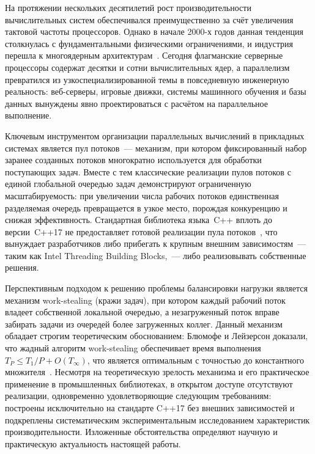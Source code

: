\introduction

На протяжении нескольких десятилетий рост производительности вычислительных
систем обеспечивался преимущественно за счёт увеличения тактовой частоты
процессоров. Однако в начале 2000-х годов данная тенденция столкнулась с
фундаментальными физическими ограничениями, и индустрия перешла к
многоядерным архитектурам~\cite{Sutter2005}. Сегодня флагманские серверные
процессоры содержат десятки и сотни вычислительных ядер, а параллелизм
превратился из узкоспециализированной темы в повседневную инженерную
реальность: веб-серверы, игровые движки, системы машинного обучения и базы
данных вынуждены явно проектироваться с расчётом на параллельное выполнение.

Ключевым инструментом организации параллельных вычислений в прикладных
системах является пул потоков~--- механизм, при котором фиксированный набор
заранее созданных потоков многократно используется для обработки поступающих
задач. Вместе с тем классические реализации пулов потоков с единой глобальной
очередью задач демонстрируют ограниченную масштабируемость: при увеличении
числа рабочих потоков единственная разделяемая очередь превращается в узкое
место, порождая конкуренцию и снижая эффективность. Стандартная библиотека
языка~C++ вплоть до версии~C++17 не предоставляет готовой реализации пула
потоков~\cite{Williams2019}, что вынуждает разработчиков либо прибегать к
крупным внешним зависимостям~--- таким как Intel Threading Building
Blocks,~--- либо реализовывать собственные решения.

Перспективным подходом к решению проблемы балансировки нагрузки является
механизм work-stealing (кражи задач), при котором каждый рабочий
поток владеет собственной локальной очередью, а незагруженный поток вправе
забирать задачи из очередей более загруженных коллег. Данный механизм обладает
строгим теоретическим обоснованием: Блюмофе и Лейзерсон доказали, что жадный
алгоритм work-stealing обеспечивает время выполнения $T_P \leq T_1 / P +
O(T_\infty)$, что является оптимальным с точностью до константного
множителя~\cite{Blumofe1999}. Несмотря на теоретическую зрелость механизма и
его практическое применение в промышленных библиотеках, в открытом доступе
отсутствуют реализации, одновременно удовлетворяющие следующим требованиям:
построены исключительно на стандарте C++17 без внешних зависимостей и
подкреплены систематическим экспериментальным исследованием характеристик
производительности. Изложенные обстоятельства определяют научную и
практическую актуальность настоящей работы.

